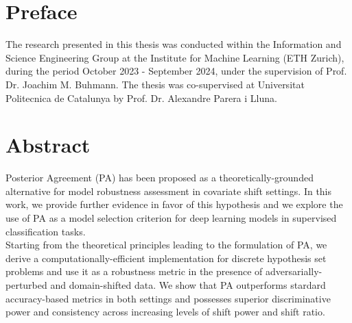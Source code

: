 
\chapter*{Preface}

The research presented in this thesis was conducted within the Information and Science Engineering Group at the Institute for Machine Learning (ETH Zurich), during the period October 2023 - September 2024, under
the supervision of Prof. Dr. Joachim M. Buhmann. The thesis was co-supervised at Universitat Politecnica de Catalunya by Prof. Dr. Alexandre Parera i Lluna.

 \cleardoublepage


 \setcounter{tocdepth}{2}
 \tableofcontents

 \cleardoublepage


\chapter*{Abstract}

 Posterior Agreement (PA) has been proposed as a theoretically-grounded alternative 
 for model robustness assessment in covariate shift settings. In this work, we provide 
 further evidence in favor of this hypothesis and we explore the use of PA as a model 
 selection criterion for deep learning models in supervised 
 classification tasks. \\
 
 Starting from the theoretical principles leading to the formulation of PA, we derive a 
 computationally-efficient implementation for discrete hypothesis set problems and use
 it as a robustness metric in the presence of adversarially-perturbed
 and domain-shifted data. We show that PA outperforms stardard accuracy-based metrics
 in both settings and possesses superior discriminative power and consistency across
 increasing levels of shift power and shift ratio. \\

 \cleardoublepage



